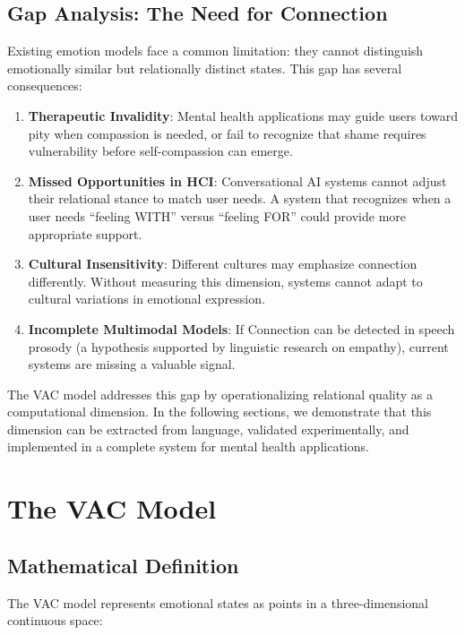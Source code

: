 \documentclass[10pt,twocolumn]{article}
\begin{document}
\subsection{Gap Analysis: The Need for Connection}

Existing emotion models face a common limitation: they cannot distinguish emotionally similar but relationally distinct states. This gap has several consequences:

\begin{enumerate}
    \item \textbf{Therapeutic Invalidity}: Mental health applications may guide users toward pity when compassion is needed, or fail to recognize that shame requires vulnerability before self-compassion can emerge.

    \item \textbf{Missed Opportunities in HCI}: Conversational AI systems cannot adjust their relational stance to match user needs. A system that recognizes when a user needs ``feeling WITH'' versus ``feeling FOR'' could provide more appropriate support.

    \item \textbf{Cultural Insensitivity}: Different cultures may emphasize connection differently. Without measuring this dimension, systems cannot adapt to cultural variations in emotional expression.

    \item \textbf{Incomplete Multimodal Models}: If Connection can be detected in speech prosody (a hypothesis supported by linguistic research on empathy), current systems are missing a valuable signal.
\end{enumerate}

The VAC model addresses this gap by operationalizing relational quality as a computational dimension. In the following sections, we demonstrate that this dimension can be extracted from language, validated experimentally, and implemented in a complete system for mental health applications.

\section{The VAC Model}
\label{sec:vac-model}
\subsection{Mathematical Definition}

The VAC model represents emotional states as points in a three-dimensional continuous space:
\end{document}
